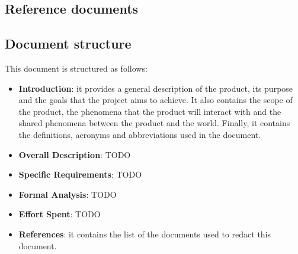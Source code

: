 \subsection{Reference documents}

\subsection{Document structure}
This document is structured as follows:
\begin{itemize}
    \item \textbf{Introduction}: it provides a general description of the product, its purpose and the goals that the project aims to achieve. It also contains the scope of the product, the phenomena that the product will interact with and the shared phenomena between the product and the world. Finally, it contains the definitions, acronyms and abbreviations used in the document.
    \item \textbf{Overall Description}: TODO
    \item \textbf{Specific Requirements}: TODO
    \item \textbf{Formal Analysis}: TODO
    \item \textbf{Effort Spent}: TODO
    \item \textbf{References}: it contains the list of the documents used to redact this document.
\end{itemize}
